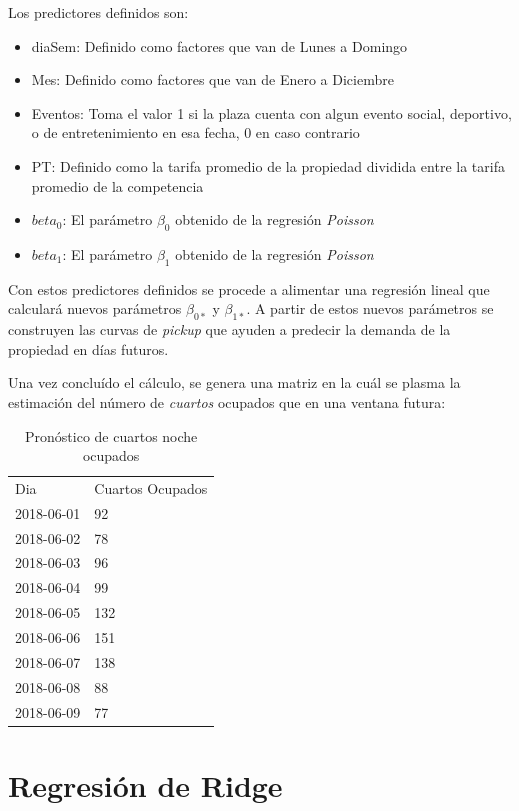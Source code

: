 Los predictores definidos son:

\begin{itemize}
  \item diaSem: Definido como factores que van de Lunes a Domingo
  \item Mes: Definido como factores que van de Enero a Diciembre
  \item Eventos: Toma el valor 1 si la plaza cuenta con algun evento social, deportivo, o de entretenimiento en esa fecha, 0 en caso contrario
  \item PT: Definido como la tarifa promedio de la propiedad dividida entre la tarifa promedio de la competencia
  \item $beta_0$: El parámetro $\beta_0$ obtenido de la regresión \emph{Poisson}
  \item $beta_1$: El parámetro $\beta_1$ obtenido de la regresión \emph{Poisson}
\end{itemize}


Con estos predictores definidos se procede a alimentar una regresión lineal que calculará nuevos parámetros $\beta_{0*}$ y $\beta_{1*}$. A partir de estos nuevos parámetros se construyen las curvas de \emph{pickup} que ayuden a predecir la demanda de la propiedad en días futuros.

Una vez concluído el cálculo, se genera una matriz en la cuál se plasma la estimación del número de \emph{cuartos} ocupados que en una ventana futura:

\begin{table}[H]
\centering
\begin{tabular}{ll}
Dia        & Cuartos Ocupados \\
2018-06-01 & 92               \\
2018-06-02 & 78               \\
2018-06-03 & 96               \\
2018-06-04 & 99               \\
2018-06-05 & 132              \\
2018-06-06 & 151              \\
2018-06-07 & 138              \\
2018-06-08 & 88               \\
2018-06-09 & 77              
\end{tabular}
\caption{Pronóstico de cuartos noche ocupados} 
\end{table}


\section*{Regresión de Ridge}


